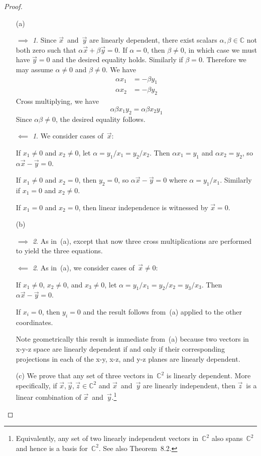 \documentclass[letterpaper,12pt]{article}
\newcommand{\C}{\mathbb{C}}
\theoremstyle{definition}
\theoremstyle{remark}
\theoremstyle{direction}
\newtheorem*{fwd}{\(\implies\)}
\newtheorem*{bwd}{\(\impliedby\)}
\begin{document}
\begin{proof}\
\begin{enumerate}
\item[(a)]
\begin{fwd}
Since \(\vec{x}\)~and~\(\vec{y}\) are linearly dependent, there exist scalars \(\alpha,\beta\in\C\) not both zero such that \(\alpha\vec{x}+\beta\vec{y}=0\). If \(\alpha=0\), then \(\beta\ne0\), in which case we must have \(\vec{y}=0\) and the desired equality holds. Similarly if \(\beta=0\). Therefore we may assume \(\alpha\ne0\) and \(\beta\ne0\). We have
\begin{align*}
\alpha x_1&=-\beta y_1\\
\alpha x_2&=-\beta y_2
\end{align*}
Cross multiplying, we have
\[\alpha\beta x_1y_2=\alpha\beta x_2y_1\]
Since \(\alpha\beta\ne0\), the desired equality follows.
\end{fwd}
\begin{bwd}
We consider cases of~\(\vec{x}\):

If \(x_1\ne0\) and \(x_2\ne0\), let \(\alpha=y_1/x_1=y_2/x_2\). Then \(\alpha x_1=y_1\) and \(\alpha x_2=y_2\), so \(\alpha\vec{x}-\vec{y}=0\).

If \(x_1\ne0\) and \(x_2=0\), then \(y_2=0\), so \(\alpha\vec{x}-\vec{y}=0\) where \(\alpha=y_1/x_1\). Similarly if \(x_1=0\) and \(x_2\ne0\).

If \(x_1=0\) and \(x_2=0\), then linear independence is witnessed by \(\vec{x}=0\).
\end{bwd}
\item[(b)]
\begin{fwd}
As in~(a), except that now three cross multiplications are performed to yield the three equations.
\end{fwd}
\begin{bwd}
As in~(a), we consider cases of~\(\vec{x}\ne0\):

If \(x_1\ne0\), \(x_2\ne0\), and \(x_3\ne0\), let \(\alpha=y_1/x_1=y_2/x_2=y_3/x_3\). Then \(\alpha\vec{x}-\vec{y}=0\).

If \(x_i=0\), then \(y_i=0\) and the result follows from~(a) applied to the other coordinates.
\end{bwd}
Note geometrically this result is immediate from~(a) because two vectors in x-y-z space are linearly dependent if and only if their corresponding projections in each of the x-y, x-z, and y-z planes are linearly dependent.
\item[(c)]
We prove that any set of three vectors in~\(\C^2\) is linearly dependent. More specifically, if \(\vec{x},\vec{y},\vec{z}\in\C^2\) and \(\vec{x}\)~and~\(\vec{y}\) are linearly independent, then \(\vec{z}\)~is a linear combination of \(\vec{x}\)~and~\(\vec{y}\).\footnote{Equivalently, any set of two linearly independent vectors in~\(\C^2\) also spans~\(\C^2\) and hence is a basis for~\(\C^2\). See also Theorem~8.2.}


\end{enumerate}
\end{proof}
\end{document}
